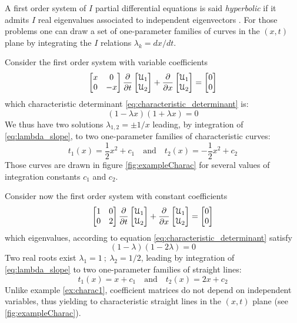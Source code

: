 A first order system of $I$ partial differential equations is said \textit{hyperbolic} if it admits $I$ real eigenvalues associated to independent eigenvectors \cite{Courant}.
For those problems one can draw a set of one-parameter families of curves in the $(x,t)$ plane by integrating the $I$ relations $\lambda_k=dx/dt$.
\begin{example}
  \label{ex:charac1}
  Consider the first order system with variable coefficients
\begin{equation*}
 \left[\begin{matrix}x &0 \\0 &-x\end{matrix}\right] \frac{\partial }{\partial t} \left[\begin{matrix}\mathcal{U}_1 \\ \mathcal{U}_2\end{matrix}\right] + \frac{\partial }{\partial x}\left[\begin{matrix}\mathcal{U}_1 \\ \mathcal{U}_2\end{matrix}\right] = \left[\begin{matrix}0 \\0\end{matrix}\right]
\end{equation*}
which characteristic determinant \eqref{eq:characteristic_determinant} is:
\begin{equation*}
  (1-\lambda x)(1+\lambda x)=0
\end{equation*}
We thus have two solutions $\lambda_{1,2}=\pm 1/x$ leading, by integration of \eqref{eq:lambda_slope}, to two one-parameter families of characteristic curves:
\begin{equation*}
  t_1(x)=\frac{1}{2}x^2+c_1  \quad \text{and} \quad t_2(x)=-\frac{1}{2}x^2+c_2 
\end{equation*}
Those curves are drawn in figure \ref{fig:exampleCharac} for several values of integration constants $c_1$ and $c_2$.
\end{example}
\begin{example}
  \label{ex:charac2}
  Consider now the first order system with constant coefficients
\begin{equation*}
 \left[\begin{matrix}1 &0 \\0 &2\end{matrix}\right] \frac{\partial }{\partial t} \left[\begin{matrix}\mathcal{U}_1 \\ \mathcal{U}_2\end{matrix}\right] + \frac{\partial }{\partial x}\left[\begin{matrix}\mathcal{U}_1 \\ \mathcal{U}_2\end{matrix}\right] = \left[\begin{matrix}0 \\0\end{matrix}\right]
\end{equation*}
which eigenvalues, according to equation \eqref{eq:characteristic_determinant} satisfy
\begin{equation*}
  (1 - \lambda )(1- 2\lambda)=0
\end{equation*}
Two real roots exist $\lambda_1=1 \: ; \: \lambda_2=1/2$, leading by integration of \eqref{eq:lambda_slope} to two one-parameter families of straight lines:
\begin{equation*}
  t_1(x)=x+c_1  \quad \text{and} \quad t_2(x)=2x+c_2 
\end{equation*}
Unlike example \ref{ex:charac1}, coefficient matrices do not depend on independent variables, thus yielding to characteristic straight lines in the $(x,t)$ plane (see \ref{fig:exampleCharac}).
\end{example}
